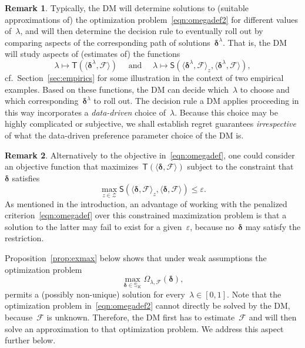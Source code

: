 \documentclass[11pt, a4paper]{article}
\theoremstyle{definition}
\newtheorem{remark}{Remark}[section]
\begin{document}
\begin{remark}\label{rem:tunefirst}
Typically, the DM will determine solutions to (suitable approximations of) the optimization problem~\eqref{eqn:omegadef2} for different values of~$\lambda$, and will then determine the decision rule to eventually roll out by comparing aspects of the corresponding path of solutions~$\bm{\delta}^{\lambda}$. That is, the DM will study aspects of (estimates of) the functions~$$\lambda \mapsto \mathsf{T}\left(\langle \bm{\delta}^{\lambda}, \mathcal{F} \rangle \right) \quad \text{ and } \quad \lambda \mapsto \mathsf{S} \left(\langle \bm{\delta}^{\lambda}, \mathcal{F} \rangle_z, \langle \bm{\delta}^{\lambda}, \mathcal{F} \rangle \right),$$ cf.~Section~\ref{sec:empirics} for some illustration in the context of two empirical examples. Based on these functions, the DM can decide which~$\lambda$ to choose and which corresponding~$\bm{\delta}^{\lambda}$ to roll out. The decision rule a DM applies proceeding in this way incorporates a \emph{data-driven} choice of~$\lambda$. Because this choice may be highly complicated or subjective, we shall establish regret guarantees \emph{irrespective} of what the data-driven preference parameter choice of the DM is.
\end{remark}

\begin{remark}\label{rem:alternreg}
	Alternatively to the objective in~\eqref{eqn:omegadef}, one could consider an objective function that maximizes~$\mathsf{T}\left( \langle \bm{\delta}, \mathcal{F} \rangle \right)$ subject to the constraint that~$\bm{\delta}$ satisfies~$$\max_{z \in \mathcal{Z}}\mathsf{S} (\langle \bm{\delta}, \mathcal{F} \rangle_z , \langle \bm{\delta}, \mathcal{F} \rangle ) \leq \varepsilon.$$ As mentioned in the introduction, an advantage of working with the penalized criterion~\eqref{eqn:omegadef} over this constrained maximization problem is that a solution to the latter may fail to exist for a given~$\varepsilon$, because no~$\bm{\delta}$ may satisfy the restriction.
\end{remark}

Proposition~\ref{prop:exmax} below shows that under weak assumptions the optimization problem 
%
\begin{equation}\label{eqn:omegadef2}
\max_{\bm{\delta} \in \mathbb{S}_K}	\Omega_{\lambda, \mathcal{F}}(\bm{\delta}),
\end{equation} 
%
permits a (possibly non-unique) solution for every~$\lambda \in [0, 1]$. Note that the optimization problem in~\eqref{eqn:omegadef2} cannot directly be solved by the DM, because~$\mathcal{F}$ is unknown. Therefore, the DM first has to estimate~$\mathcal{F}$ and will then solve an approximation to that optimization problem. We address this aspect further below.
\end{document}
